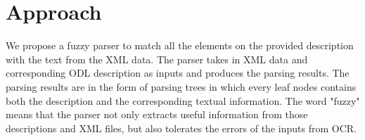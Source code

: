\section{Approach}
\label{sec:appro}
%
%

%
 
We propose a fuzzy parser to match all the elements on 
the provided description with the text from the XML data. The 
parser takes in XML data and corresponding ODL description as inputs 
and produces the parsing results. The parsing results are in the form of 
parsing trees in which every leaf nodes contains both the description and 
the corresponding textual information.
The word "fuzzy" means that the parser not only extracts useful information 
from those descriptions and XML files, but also tolerates the errors of 
the inputs from OCR. 


